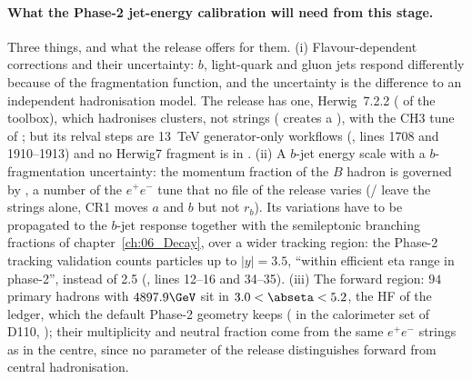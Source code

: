 \paragraph{What the Phase-2 jet-energy calibration will need from this stage.}
Three things, and what the release offers for them. (i) Flavour-dependent corrections and their uncertainty: $b$,
light-quark and gluon jets respond differently because of the fragmentation function, and the uncertainty is the
difference to an independent hadronisation model. The release has one, Herwig~7.2.2 ( of the
toolbox), which hadronises clusters, not strings ( creates a
), with the CH3 tune of ; but
its relval steps are 13~TeV generator-only workflows (, lines 1708 and 1910--1913) and no
Herwig7 fragment is in . (ii) A $b$-jet energy scale with a $b$-fragmentation uncertainty: the
momentum fraction of the $B$ hadron is governed by , a number of the $e^+e^-$ tune that no file
of the release varies (/ leave the strings alone, CR1 moves $a$ and $b$ but not $r_b$).
Its variations have to be propagated to the $b$-jet response together with the semileptonic branching fractions of
chapter~\ref{ch:06_Decay}, over a wider tracking region: the Phase-2 tracking validation counts particles up to $|y| =
3.5$, ``within efficient eta range in phase-2'', instead of 2.5
(, lines 12--16 and 34--35). (iii)
The forward region: $94$ primary hadrons with $4897.9\GeV$ sit in $3.0<\abseta<5.2$, the HF of the ledger, which the
default Phase-2 geometry keeps ( in the calorimeter set  of D110,
); their multiplicity and neutral fraction come from the same
$e^+e^-$ strings as in the centre, since no parameter of the release distinguishes forward from central hadronisation.
